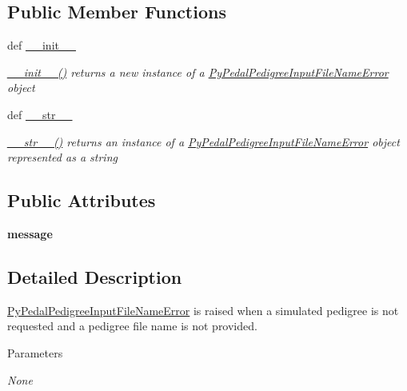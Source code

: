 \subsection*{Public Member Functions}
\begin{DoxyCompactItemize}
\item 
def \hyperlink{classPyPedal_1_1pyp__newclasses_1_1PyPedalPedigreeInputFileNameError_a7b690886b81fead4dd46c9d2c77cc45f}{\_\-\_\-init\_\-\_\-}
\begin{DoxyCompactList}\small\item\em \hyperlink{classPyPedal_1_1pyp__newclasses_1_1PyPedalPedigreeInputFileNameError_a7b690886b81fead4dd46c9d2c77cc45f}{\_\-\_\-init\_\-\_\-()} returns a new instance of a \hyperlink{classPyPedal_1_1pyp__newclasses_1_1PyPedalPedigreeInputFileNameError}{PyPedalPedigreeInputFileNameError} object \item\end{DoxyCompactList}\item 
def \hyperlink{classPyPedal_1_1pyp__newclasses_1_1PyPedalPedigreeInputFileNameError_a36211de08dd7051cb0dafec75bfb5a2c}{\_\-\_\-str\_\-\_\-}
\begin{DoxyCompactList}\small\item\em \hyperlink{classPyPedal_1_1pyp__newclasses_1_1PyPedalPedigreeInputFileNameError_a36211de08dd7051cb0dafec75bfb5a2c}{\_\-\_\-str\_\-\_\-()} returns an instance of a \hyperlink{classPyPedal_1_1pyp__newclasses_1_1PyPedalPedigreeInputFileNameError}{PyPedalPedigreeInputFileNameError} object represented as a string \item\end{DoxyCompactList}\end{DoxyCompactItemize}
\subsection*{Public Attributes}
\begin{DoxyCompactItemize}
\item 
\hypertarget{classPyPedal_1_1pyp__newclasses_1_1PyPedalPedigreeInputFileNameError_a11a7c0d3a1ee1e2d8f28dcb5cf33c2e8}{
{\bfseries message}}
\label{classPyPedal_1_1pyp__newclasses_1_1PyPedalPedigreeInputFileNameError_a11a7c0d3a1ee1e2d8f28dcb5cf33c2e8}

\end{DoxyCompactItemize}


\subsection{Detailed Description}
\hyperlink{classPyPedal_1_1pyp__newclasses_1_1PyPedalPedigreeInputFileNameError}{PyPedalPedigreeInputFileNameError} is raised when a simulated pedigree is not requested and a pedigree file name is not provided. 
\begin{DoxyParams}{Parameters}
\item[{\em None}]\end{DoxyParams}

